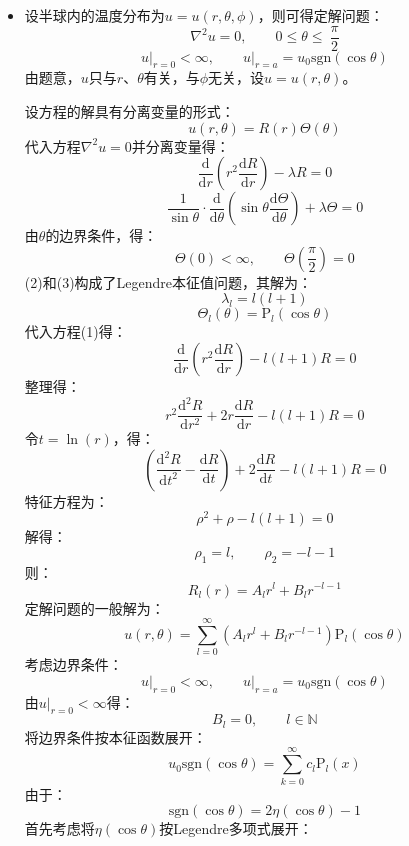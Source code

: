 \documentclass[fontset=windows]{ctexart}
\begin{document}
\begin{itemize}
    综上，定解问题的解为：
    \[
    u(r,\theta) = \frac{b-3a}{3(b-a)}u_0 + \frac{2b}{3(b-a)}\cdot\frac{a}{r}u_0 +\frac{2b^3 a^2}{3(b^5-a^5)}\left[\left(\frac{r}{a}\right)^2 - \left(\frac{a}{r}\right)^3\right]u_0 \mathrm{P}_2(\cos\theta)
    \]
    \bigskip

    \item[7.]
    设半球内的温度分布为$u = u(r,\theta,\phi)$，则可得定解问题：
    \[
    \nabla^2 u = 0,\qquad 0\leqslant\theta\leqslant\ \frac{\pi}{2}
    \]
    \[
    \left.u\right|_{r=0} < \infty,\qquad \left.u\right|_{r=a} = u_0\mathrm{sgn}(\cos\theta)
    \]
    由题意，$u$只与$r$、$\theta$有关，与$\phi$无关，设$u = u(r,\theta)$。

    设方程的解具有分离变量的形式：
    \[
    u(r,\theta) = R(r)\varTheta(\theta)
    \]
    代入方程$\nabla^2 u=0$并分离变量得：
    \[
    \frac{\mathrm{d}}{\mathrm{d}r}\left(r^2\frac{\mathrm{d}R}{\mathrm{d}r}\right) - \lambda R = 0 \tag{1}
    \]
    \[
    \frac{1}{\sin\theta}\cdot\frac{\mathrm{d}}{\mathrm{d}\theta}\left(\sin\theta\frac{\mathrm{d}\varTheta}{\mathrm{d}\theta}\right) + \lambda\varTheta = 0 \tag{2}
    \]
    由$\theta$的边界条件，得：
    \[
    \varTheta(0)<\infty,\qquad \varTheta\left(\frac{\pi}{2}\right)=0 \tag{3}
    \]
    (2)和(3)构成了Legendre本征值问题，其解为：
    \[
    \lambda_l = l(l+1)
    \]
    \[
    \varTheta_l(\theta) = \mathrm{P}_l(\cos\theta)
    \]
    代入方程(1)得：
    \[
    \frac{\mathrm{d}}{\mathrm{d}r}\left(r^2\frac{\mathrm{d}R}{\mathrm{d}r}\right) - l(l+1)R = 0 \tag{4}
    \]
    整理得：
    \[
    r^2\frac{\mathrm{d}^2 R}{\mathrm{d}r^2} + 2r\frac{\mathrm{d}R}{\mathrm{d}r} - l(l+1)R = 0
    \]
    令$t = \ln(r)$，得：
    \[
    \left(\frac{\mathrm{d}^2 R}{\mathrm{d}t^2} - \frac{\mathrm{d}R}{\mathrm{d}t}\right) + 2\frac{\mathrm{d}R}{\mathrm{d}t} - l(l+1)R = 0
    \]
    特征方程为：
    \[
    \rho^2 + \rho - l(l+1) = 0
    \]
    解得：
    \[
    \rho_1 = l,\qquad \rho_2 = -l-1
    \]
    则：
    \[
    R_l(r) = A_lr^l + B_lr^{-l-1}
    \]
    定解问题的一般解为：
    \[
    u(r,\theta) = \sum_{l=0}^{\infty}(A_lr^l + B_lr^{-l-1})\mathrm{P}_l(\cos\theta)
    \]
    考虑边界条件：
    \[
    \left.u\right|_{r=0} < \infty,\qquad \left.u\right|_{r=a} = u_0\mathrm{sgn}(\cos\theta)
    \]
    由$\left.u\right|_{r=0} < \infty$得：
    \[
    B_l = 0,\qquad l\in\mathbb{N}
    \]
    将边界条件按本征函数展开：
    \[
    u_0\mathrm{sgn}(\cos\theta) = \sum_{k=0}^{\infty}c_l \mathrm{P}_l(x)
    \]
    由于：
    \[
    \mathrm{sgn}(\cos\theta) = 2\eta(\cos\theta)-1
    \]
    首先考虑将$\eta(\cos\theta)$按Legendre多项式展开：

\end{itemize}
\end{document}
